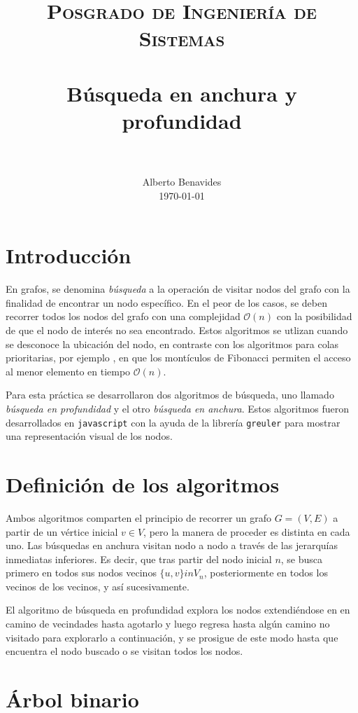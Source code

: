\documentclass[paper=leter, fontsize=11pt]{scrartcl}
\title{
		\usefont{OT1}{bch}{b}{n}
		\normalfont \normalsize \textsc{Posgrado de Ingeniería de Sistemas} \\ [25pt]
		\horrule{0.5pt} \\[0.4cm]
		\huge Búsqueda en anchura y profundidad \\
		\horrule{2pt} \\[0.5cm]
}
\author{
		\normalfont 								\normalsize
        Alberto Benavides\\[-3pt]		\normalsize
        \today
}
\date{}
\numberwithin{equation}{section}		%
\numberwithin{figure}{section}			%
\numberwithin{table}{section}				%
\begin{document}
\maketitle

\section{Introducción}

En grafos, se denomina \textit{búsqueda} a la operación de visitar nodos del grafo con la finalidad de encontrar un nodo específico. En el peor de los casos, se deben recorrer todos los nodos del grafo con una complejidad $\mathcal{O}(n)$ con la posibilidad de que el nodo de interés no sea encontrado. Estos algoritmos se utlizan cuando se desconoce la ubicación del nodo, en contraste con los algoritmos para colas prioritarias, por ejemplo , en que los montículos de Fibonacci permiten el acceso al menor elemento en tiempo $\mathcal{O}(n)$.

Para esta práctica se desarrollaron dos algoritmos de búsqueda, uno llamado \textit{búsqueda en profundidad} y el otro \textit{búsqueda en anchura}. Estos algoritmos fueron desarrollados en \texttt{javascript} con la ayuda de la librería \texttt{greuler} \cite{greuler} para mostrar una representación visual de los nodos.

\section{Definición de los algoritmos}

Ambos algoritmos comparten el principio de recorrer un grafo $G = (V, E)$ a partir de un vértice inicial $v \in V$, pero la manera de proceder es distinta en cada uno. Las búsquedas en anchura visitan nodo a nodo a través de las jerarquías inmediatas inferiores. Es decir, que tras partir del nodo inicial $n$, se busca primero en todos sus nodos vecinos $\{u, v\} in V_n$, posteriormente en todos los vecinos de los vecinos, y así sucesivamente. 

El algoritmo de búsqueda en profundidad explora los nodos extendiéndose en en camino de vecindades hasta agotarlo y luego regresa hasta algún camino no visitado para explorarlo a continuación, y se prosigue de este modo hasta que encuentra el nodo buscado o se visitan todos los nodos. 

\section{Árbol binario}
\end{document}
